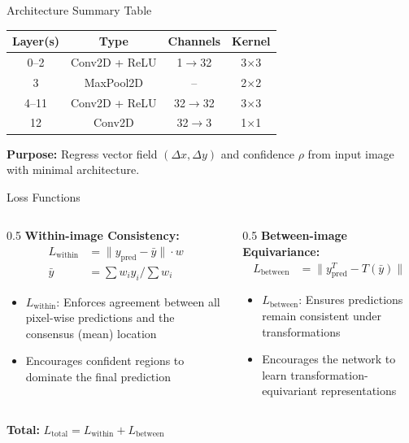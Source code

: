 \begin{frame}{Architecture Summary Table}
\begin{center}
\begin{tabular}{|c|c|c|c|}
\hline
\textbf{Layer(s)} & \textbf{Type} & \textbf{Channels} & \textbf{Kernel} \\
\hline
0--2 & Conv2D + ReLU & 1$\rightarrow$32 & 3$\times$3 \\
\hline
3 & MaxPool2D & -- & 2$\times$2 \\
\hline
4--11 & Conv2D + ReLU & 32$\rightarrow$32 & 3$\times$3 \\
\hline
12 & Conv2D & 32$\rightarrow$3 & 1$\times$1 \\
\hline
\end{tabular}
\end{center}
\vspace{0.5em}
\textbf{Purpose:} Regress vector field $(\Delta x, \Delta y)$ and confidence $\rho$ from input image with minimal architecture.
\end{frame}

\begin{frame}{Loss Functions}
\vspace{-0.5cm}
\begin{columns}
\begin{column}{0.5\textwidth}
\textbf{Within-image Consistency:}
\begin{align}
L_{\text{within}} &= \| y_{\text{pred}} - \bar{y} \| \cdot w \\
\bar{y} &= \sum w_i y_i / \sum w_i
\end{align}
\begin{itemize}
    \item $L_{\text{within}}$: Enforces agreement between all pixel-wise predictions and the consensus (mean) location
    \item Encourages confident regions to dominate the final prediction
\end{itemize}
\end{column}
\begin{column}{0.5\textwidth}
\textbf{Between-image Equivariance:}
\begin{align}
L_{\text{between}} &= \| y^{T}_{\text{pred}} - T(\bar{y}) \|
\end{align}
\begin{itemize}
    \item $L_{\text{between}}$: Ensures predictions remain consistent under transformations
    \item Encourages the network to learn transformation-equivariant representations
\end{itemize}
\end{column}
\end{columns}
\vspace{1em}
\centering\textbf{Total:} $L_{\text{total}} = L_{\text{within}} + L_{\text{between}}$

\end{frame}

